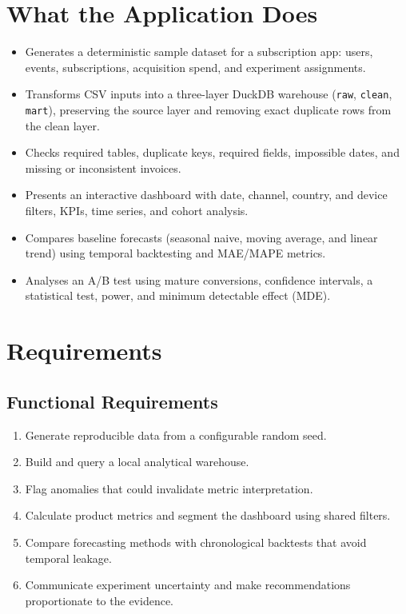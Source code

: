 \documentclass[a4paper,11pt]{article}
\begin{document}
\section{What the Application Does}
\begin{itemize}
  \item Generates a deterministic sample dataset for a subscription app: users, events, subscriptions, acquisition spend, and experiment assignments.
  \item Transforms CSV inputs into a three-layer DuckDB warehouse (\texttt{raw}, \texttt{clean}, \texttt{mart}), preserving the source layer and removing exact duplicate rows from the clean layer.
  \item Checks required tables, duplicate keys, required fields, impossible dates, and missing or inconsistent invoices.
  \item Presents an interactive dashboard with date, channel, country, and device filters, KPIs, time series, and cohort analysis.
  \item Compares baseline forecasts (seasonal naive, moving average, and linear trend) using temporal backtesting and MAE/MAPE metrics.
  \item Analyses an A/B test using mature conversions, confidence intervals, a statistical test, power, and minimum detectable effect (MDE).
\end{itemize}

\section{Requirements}
\subsection{Functional Requirements}
\begin{enumerate}
  \item Generate reproducible data from a configurable random seed.
  \item Build and query a local analytical warehouse.
  \item Flag anomalies that could invalidate metric interpretation.
  \item Calculate product metrics and segment the dashboard using shared filters.
  \item Compare forecasting methods with chronological backtests that avoid temporal leakage.
  \item Communicate experiment uncertainty and make recommendations proportionate to the evidence.
\end{enumerate}
\end{document}
